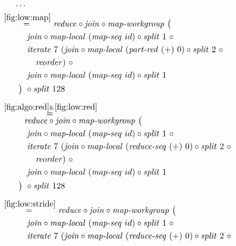 \begin{figure*}[t]
\begin{align*}
  &\hspace{.5em}\ldots\\
%
  &\hspace{-2em}\quad\begin{aligned}
    &\overset{\ref{fig:low:map}}{=\hspace{.2em}}
      \reduce \circ \join \circ \mapWorkgroup\ \big(\\
    &\qquad\quad\join \circ \mapLocal\ (\mapSeq\ id) \circ \splitN\ 1\ \circ\\
    &\qquad\quad\iterateN\ 7\ (\join \circ \mapLocal\ (\partRed\ (+)\ 0) \circ \splitN\ 2\ \circ\\
    &\qquad\qquad \reorder)\ \circ\\
    &\qquad\quad\join \circ \mapLocal\ (\mapSeq\ id) \circ \splitN\ 1\\
    &\qquad\big)\ \circ \splitN\ 128
  \end{aligned}\\[.5em]
%
  &\hspace{-2em}\quad\begin{aligned}
    &\overset{\ref{fig:algo:red}\&\ref{fig:low:red}}{=\hspace{.2em}}\\[-.75em]
    &\qquad\ \ 
      \reduce \circ \join \circ \mapWorkgroup\ \big(\\
    &\qquad\quad\join \circ \mapLocal\ (\mapSeq\ id) \circ \splitN\ 1\ \circ\\
    &\qquad\quad\iterateN\ 7\ (\join \circ \mapLocal\ (\reduceSeq\ (+)\ 0) \circ \splitN\ 2\ \circ\\
    &\qquad\qquad \reorder)\ \circ\\
    &\qquad\quad\join \circ \mapLocal\ (\mapSeq\ id) \circ \splitN\ 1\\
    &\qquad\big)\ \circ \splitN\ 128
  \end{aligned}\\[.5em]
%
  &\hspace{-2em}\quad\begin{aligned}
    &\overset{\ref{fig:low:stride}}{=\hspace{.2em}}
      \reduce \circ \join \circ \mapWorkgroup\ \big(\\
    &\qquad\quad\join \circ \mapLocal\ (\mapSeq\ id) \circ \splitN\ 1\ \circ\\
    &\qquad\quad\iterateN\ 7\ (\join \circ \mapLocal\ (\reduceSeq\ (+)\ 0) \circ \splitN\ 2\ \circ\\

\end{aligned}
\end{align*}
\end{figure*}
